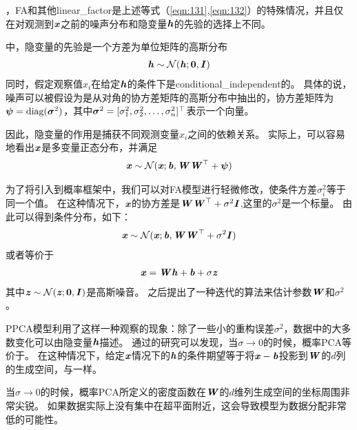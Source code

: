 ，\gls{FA}和其他\gls{linear_factor}是上述等式（\eqref{eqn:131},\eqref{eqn:132}）的特殊情况，并且仅在对观测到$\boldsymbol{\mathit{x}}$之前的噪声分布和隐变量$\boldsymbol{\mathit{h}}$的先验的选择上不同。

\citep{Bartholomew-1987,Basilevsky94}中，隐变量的先验是一个方差为单位矩阵的高斯分布
\begin{align}
\label{eqn:133}
\Vh \sim \CalN(\Vh; \mathbf{0},\MI)
\end{align}
同时，假定观察值$x_i$在给定$\boldsymbol{\mathit{h}}$的条件下是\gls{conditional_independent}的。
具体的说，噪声可以被假设为是从对角的协方差矩阵的高斯分布中抽出的，协方差矩阵为$\boldsymbol{\psi} = \text{diag}(\boldsymbol{\sigma}^2)$，其中$\boldsymbol{\sigma}^2 = [\sigma_1^2,\sigma_2^2,\ldots,\sigma_n^2]^{\top}$表示一个向量。


因此，隐变量的作用是捕获不同观测变量$x_i$之间的依赖关系。
实际上，可以容易地看出$\boldsymbol{\mathit{x}}$是多变量正态分布，并满足
\begin{align}
\label{eqn:134}
\Vx \sim \CalN(\Vx; \Vb, \MW\MW^{\top}+\Vpsi)
\end{align}



为了将引入到概率框架中，我们可以对\gls{FA}模型进行轻微修改，使条件方差$\sigma_i^2$等于同一个值。
在这种情况下，$\boldsymbol{\mathit{x}}$的协方差是$\boldsymbol{\mathit{W}}\boldsymbol{\mathit{W}}^{\top}+\sigma^2\boldsymbol{\mathit{I}}$,这里的$\sigma^2$是一个标量。
由此可以得到条件分布，如下：
\begin{align}
\label{eqn:135}
\Vx \sim \CalN(\Vx; \Vb, \MW\MW^{\top} + \sigma^2\MI )
\end{align}
或者等价于
\begin{align}
\label{eqn:136}
\Vx = \MW\Vh + \Vb + \sigma\Vz
\end{align}
其中$\boldsymbol{\mathit{z}} \sim \mathcal{N}(\boldsymbol{\mathit{z}};\mathbf{0},\boldsymbol{\mathit{I}})$是高斯噪音。
之后\citep{tipping99mixtures}提出了一种迭代的算法来估计参数$\boldsymbol{\mathit{W}}$和$\sigma^2$。


\gls{PPCA}模型利用了这样一种观察的现象：除了一些小的重构误差$\sigma^2$，数据中的大多数变化可以由隐变量$\boldsymbol{\mathit{h}}$描述。
通过\citet{tipping99mixtures}的研究可以发现，当$\sigma \xrightarrow{} 0$的时候，概率PCA等价于。
在这种情况下，给定$\boldsymbol{\mathit{x}}$情况下的$\boldsymbol{\mathit{h}}$的条件期望等于将$\boldsymbol{\mathit{x}} - \boldsymbol{\mathit{b}}$投影到$\boldsymbol{\mathit{W}}$的$d$列的生成空间，与一样。

当$\sigma\xrightarrow{} 0$的时候，概率PCA所定义的密度函数在$\boldsymbol{\mathit{W}}$的$d$维列生成空间的坐标周围非常尖锐。
如果数据实际上没有集中在超平面附近，这会导致模型为数据分配非常低的可能性。

\section{}
\label{sec:independent_component_analysis_ica}


